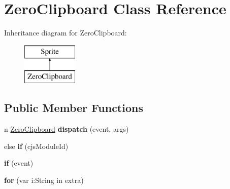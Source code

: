 \hypertarget{class_zero_clipboard}{\section{Zero\-Clipboard Class Reference}
\label{class_zero_clipboard}
}
Inheritance diagram for Zero\-Clipboard\-:\begin{figure}[H]
\begin{center}
\leavevmode
\includegraphics[height=2.000000cm]{class_zero_clipboard}
\end{center}
\end{figure}
\subsection*{Public Member Functions}
\begin{DoxyCompactItemize}
\item 
\hypertarget{class_zero_clipboard_a5fd3a6e1bd4452b4defc7b65b445795b}{n \hyperlink{class_zero_clipboard}{Zero\-Clipboard} {\bfseries dispatch} (event, args)}\label{class_zero_clipboard_a5fd3a6e1bd4452b4defc7b65b445795b}

\item 
\hypertarget{class_zero_clipboard_a9d15d9f187f215f5833c5f0f5cc35ba8}{else {\bfseries if} (cjs\-Module\-Id)}\label{class_zero_clipboard_a9d15d9f187f215f5833c5f0f5cc35ba8}

\item 
\hypertarget{class_zero_clipboard_a57cb7da0b9dca2012d3eb02cb507c3ca}{{\bfseries if} (event)}\label{class_zero_clipboard_a57cb7da0b9dca2012d3eb02cb507c3ca}

\item 
\hypertarget{class_zero_clipboard_ae1b7fbd4e6911bc536fb8f2dc676514f}{{\bfseries for} (var i\-:\-String in extra)}\label{class_zero_clipboard_ae1b7fbd4e6911bc536fb8f2dc676514f}

\end{DoxyCompactItemize}
